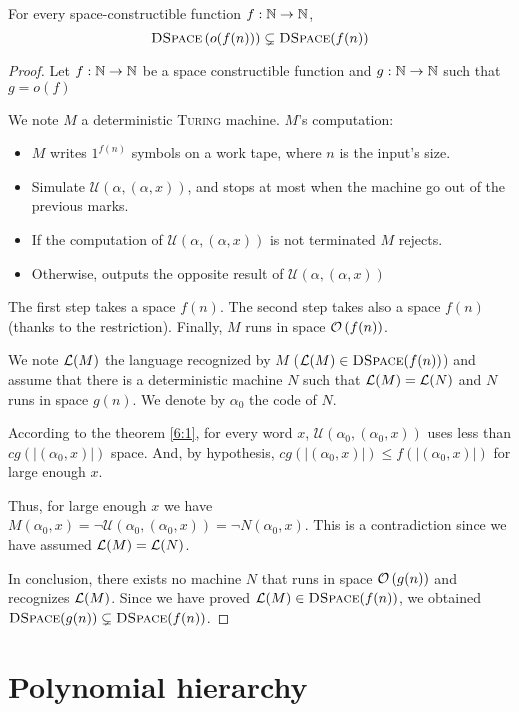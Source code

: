 \begin{thm}
    For every space-constructible function $f:\mathbb{N} \to \mathbb{N}$,    
    $$
        \textsc{DSpace}\left(o(f(n))\right) \subsetneq \textsc{DSpace}(f(n))
    $$
\end{thm}
\begin{proof}
Let $f:\mathbb{N}\to\mathbb{N}$ be a space constructible function and $g:\mathbb{N}\to\mathbb{N}$ such that $g=o(f)$

We note $M$ a deterministic \textsc{Turing} machine. $M$'s computation:
\begin{itemize}
    \item $M$ writes $1^{f(n)}$ symbols on a work tape, where $n$ is the input's size.
    \item Simulate $\mathcal{U}(\alpha,(\alpha,x))$, and stops at most when the machine go out of the previous marks.
    \item If the computation of $\mathcal{U}(\alpha,(\alpha,x))$ is not terminated $M$ rejects.
    \item Otherwise, outputs the opposite result of $\mathcal{U}(\alpha,(\alpha,x))$
\end{itemize}

    The first step takes a space $f(n)$. The second step takes also a space $f(n)$ (thanks to the restriction). Finally, $M$ runs in space $\mathcal O \left( f(n) \right)$.

    We note $\mathcal{L}(M)$ the language recognized by $M$ ($\mathcal{L}(M)\in\textsc{DSpace}(f(n))$) and assume that there is a deterministic machine $N$ such that $\mathcal{L}(M)= \mathcal{L}(N)$ and $N$ runs in space $g(n)$. We denote by $\alpha_0$ the code of $N$.

    According to the theorem \ref{6:1}, for every word $x$, $\mathcal{U}(\alpha_0,(\alpha_0,x))$ uses less than $c g(|(\alpha_0,x)|)$ space. And, by hypothesis, $c g(|(\alpha_0,x)|) \leqslant f(|(\alpha_0,x)|)$ for large enough $x$.

    Thus, for large enough $x$ we have $M(\alpha_0,x) = \neg\mathcal{U}(\alpha_0,(\alpha_0,x)) = \neg N(\alpha_0,x)$. This is a contradiction since we have assumed $\mathcal{L}(M)= \mathcal{L}(N)$.
  
  In conclusion, there exists no machine $N$ that runs in space $\mathcal O \left( g(n) \right)$ and recognizes $\mathcal{L}(M)$. Since we have proved $\mathcal{L}(M) \in \textsc{DSpace}(f(n))$, we obtained $\textsc{DSpace} (g(n)) \subsetneq \textsc{DSpace}(f(n))$.
\end{proof}


\section{Polynomial hierarchy}



